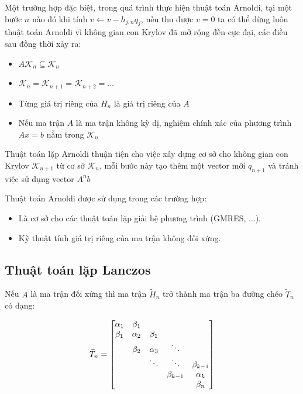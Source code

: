 \documentclass[14pt, a4paper]{article}
\numberwithin{equation}{section}
\numberwithin{algorithm}{section}
\numberwithin{figure}{section}
\numberwithin{dl}{section}
\numberwithin{md}{section}
\numberwithin{bd}{section}
\numberwithin{dn}{section}
\begin{document}
Một trường hợp đặc biệt, trong quá trình thực hiện thuật toán Arnoldi, tại một bước $n$ nào đó khi tính $v \leftarrow v - h_{j,n}q_j$, nếu thu được $v=0$ ta có thể dừng luôn thuật toán Arnoldi vì không gian con Krylov đã mở rộng đến cực đại, các điều sau đồng thời xảy ra:


\begin{itemize}
    \item $A\mathcal{K}_n \subseteq  \mathcal{K}_n$
    \item $\mathcal{K}_n=\mathcal{K}_{n+1}=\mathcal{K}_{n+2}=\dots$
    \item Từng giá trị riêng của $ H_n$ là giá trị riêng của $A$
    \item Nếu ma trận $A$ là ma trận không kỳ dị, nghiệm chính xác của phương trình $Ax=b$ nằm trong $\mathcal{K}_n$
\end{itemize}


Thuật toán lặp Arnoldi thuận tiện cho việc xây dựng cơ sở cho không gian con Krylov $\mathcal{K}_{n+1}$ từ cơ sở $\mathcal{K}_n$, mỗi bước này tạo thêm một vector mới $q_{n+1}$ và tránh việc sử dụng vector $A^n b$

Thuật toán Arnoldi được sử dụng trong các trường hợp:
\begin{itemize}
    \item Là cơ sở cho các thuật toán lặp giải hệ phương trình (GMRES, ...).
    \item Kỹ thuật tính giá trị riêng của ma trận không đối xứng.
\end{itemize}

\subsection{Thuật toán lặp Lanczos} \label{Lanczos-Algorithm}


Nếu $A$ là ma trận đối xứng thì ma trận $\widetilde{H}_n$ trở thành ma trận ba đường chéo $\widetilde{T}_n$ có dạng:

\begin{equation} \label{eq:Trigonal_Matrix}
    \widetilde{T}_n = \begin{bmatrix}
        \alpha_1 & \beta_1 & \space & \space & \space \\
        \beta_1 & \alpha_2 & \beta_1 & \space & \space \\
        \space & \beta_2 & \alpha_3 & \ddots & \space \\
        \space & \space & \ddots & \ddots & \beta_{k-1} \\
        \space & \space & \space & \beta_{k-1} & \alpha_k \\
        \space & \space & \space & \space & \beta_{n}
    \end{bmatrix}
\end{equation}
\end{document}
